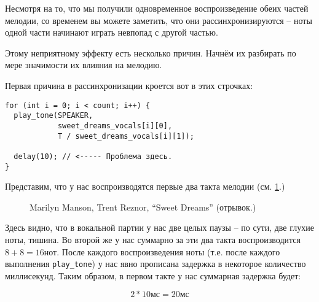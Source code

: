 \documentclass[../sparc.tex]{subfiles}
\begin{document}
Несмотря на то, что мы получили одновременное воспроизведение обеих частей
мелодии, со временем вы можете заметить, что они рассинхронизируются -- ноты
одной части начинают играть невпопад с другой частью.

Этому неприятному эффекту есть несколько причин.  Начнём их разбирать по мере
значимости их влияния на мелодию.

Первая причина в рассинхронизации кроется вот в этих строчках:

\begin{verbatim}
for (int i = 0; i < count; i++) {
  play_tone(SPEAKER,
            sweet_dreams_vocals[i][0],
            T / sweet_dreams_vocals[i][1]);

  delay(10); // <----- Проблема здесь.
}
\end{verbatim}

Представим, что у нас воспроизводятся первые два такта мелодии
(см. \ref{fig:lilypond-melody-sweet-dreams-part}.)

\begin{figure}[h!]
  \caption{Marilyn Manson, Trent Reznor, ``Sweet Dreams'' (отрывок.)}
  \label{fig:lilypond-melody-sweet-dreams-part}
\end{figure}

Здесь видно, что в вокальной партии у нас две целых паузы -- по сути, две глухие
ноты, тишина.  Во второй же у нас суммарно за эти два такта воспроизводится $8 +
8 = 16 \mbox{нот}$.  После каждого воспроизведения ноты (т.е. после каждого
выполнения \texttt{play\_tone}) у нас явно прописана задержка в некоторое
количество миллисекунд.  Таким образом, в первом такте у нас суммарная задержка
будет:

\begin{equation}
  2 * 10 \mbox{мс} = 20 \mbox{мс}
\end{equation}
\end{document}
